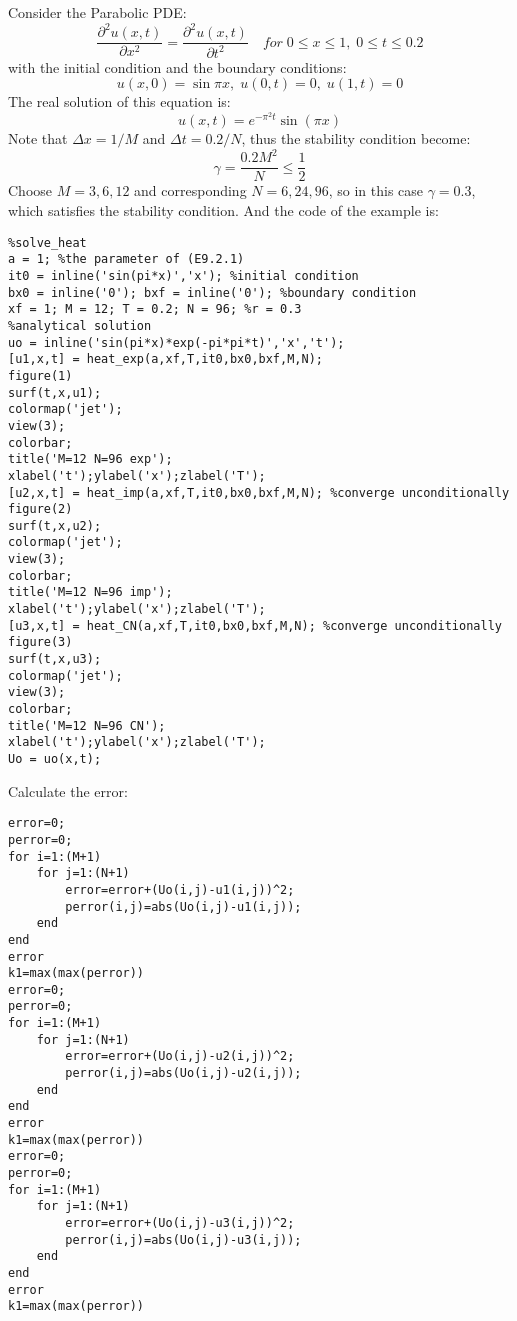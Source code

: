\documentclass[a4paper]{article}
\begin{document}
Consider the Parabolic PDE:
\begin{equation}
\frac{{{\partial ^2}u(x,t)}}{{\partial {x^2}}} = \frac{{{\partial ^2}u(x,t)}}{{\partial {t^2}}}\quad for\;0 \le x \le 1,\;0 \le t \le 0.2
\end{equation}
with the initial condition and the boundary conditions:
\begin{equation}
u(x,0) = \sin \pi x,\;u(0,t) = 0,\;u(1,t) = 0
\end{equation}
The real solution of this equation is:
\begin{equation}
u(x,t) = {e^{ - {\pi ^2}t}}\sin (\pi x)
\end{equation}
Note that $\Delta x = 1/M$ and $\Delta t = 0.2/N$, thus the stability condition become:
\begin{equation}
\gamma  = \frac{{0.2{M^2}}}{N} \le \frac{1}{2}
\end{equation}
Choose $M = 3,6,12$ and corresponding $N = 6,24,96$, so in this case $\gamma = 0.3$, which satisfies the stability condition.
And the code of the example is:
\begin{verbatim}
%solve_heat
a = 1; %the parameter of (E9.2.1)
it0 = inline('sin(pi*x)','x'); %initial condition
bx0 = inline('0'); bxf = inline('0'); %boundary condition
xf = 1; M = 12; T = 0.2; N = 96; %r = 0.3
%analytical solution
uo = inline('sin(pi*x)*exp(-pi*pi*t)','x','t');
[u1,x,t] = heat_exp(a,xf,T,it0,bx0,bxf,M,N);
figure(1)
surf(t,x,u1);
colormap('jet');
view(3);
colorbar;
title('M=12 N=96 exp');
xlabel('t');ylabel('x');zlabel('T');
[u2,x,t] = heat_imp(a,xf,T,it0,bx0,bxf,M,N); %converge unconditionally
figure(2)
surf(t,x,u2);
colormap('jet');
view(3);
colorbar;
title('M=12 N=96 imp');
xlabel('t');ylabel('x');zlabel('T');
[u3,x,t] = heat_CN(a,xf,T,it0,bx0,bxf,M,N); %converge unconditionally
figure(3)
surf(t,x,u3);
colormap('jet');
view(3);
colorbar;
title('M=12 N=96 CN');
xlabel('t');ylabel('x');zlabel('T');
Uo = uo(x,t);
\end{verbatim}
Calculate the error:
\begin{verbatim}
error=0;
perror=0;
for i=1:(M+1)
    for j=1:(N+1)
        error=error+(Uo(i,j)-u1(i,j))^2;
        perror(i,j)=abs(Uo(i,j)-u1(i,j));
    end
end
error
k1=max(max(perror))
error=0;
perror=0;
for i=1:(M+1)
    for j=1:(N+1)
        error=error+(Uo(i,j)-u2(i,j))^2;
        perror(i,j)=abs(Uo(i,j)-u2(i,j));
    end
end
error
k1=max(max(perror))
error=0;
perror=0;
for i=1:(M+1)
    for j=1:(N+1)
        error=error+(Uo(i,j)-u3(i,j))^2;
        perror(i,j)=abs(Uo(i,j)-u3(i,j));
    end
end
error
k1=max(max(perror))
\end{verbatim}
\end{document}
